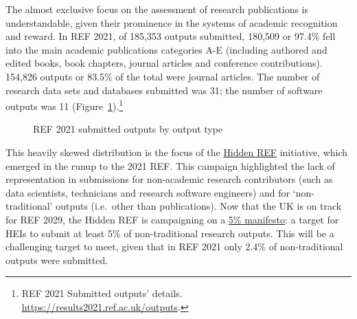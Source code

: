 \documentclass[
  letterpaper,
  DIV=11,
  numbers=noendperiod,
  oneside]{scrreprt}
\begin{document}
The almost exclusive focus on the assessment of research publications is
understandable, given their prominence in the systems of academic
recognition and reward. In REF 2021, of 185,353 outputs submitted,
180,509 or 97.4\% fell into the main academic publications categories
A-E (including authored and edited books, book chapters, journal
articles and conference contributions). 154,826 outputs or 83.5\% of the
total were journal articles. The number of research data sets and
databases submitted was 31; the number of software outputs was 11
(Figure~\ref{fig-refoutputs}).\footnote{REF 2021 Submitted outputs'
  details. \url{https://results2021.ref.ac.uk/outputs}.}

\begin{figure}


\caption{\label{fig-refoutputs}REF 2021 submitted outputs by output
type}

\end{figure}%

This heavily skewed distribution is the focus of the
\href{https://hidden-ref.org/}{Hidden REF} initiative, which emerged in
the runup to the 2021 REF. This campaign highlighted the lack of
representation in submissions for non-academic research contributors
(such as data scientists, technicians and research software engineers)
and for `non-traditional' outputs (i.e.~other than publications). Now
that the UK is on track for REF 2029, the Hidden REF is campaigning on a
\href{https://hidden-ref.org/the-5-percent-manifesto/}{5\% manifesto}: a
target for HEIs to submit at least 5\% of non-traditional research
outputs. This will be a challenging target to meet, given that in REF
2021 only 2.4\% of non-traditional outputs were submitted.
\end{document}
